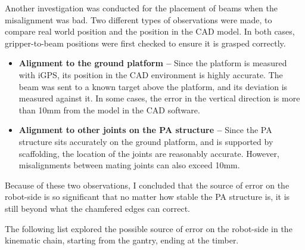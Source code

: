 Another investigation was conducted for the placement of beams when the misalignment was bad. Two different types of observations were made, to compare real world position and the position in the CAD model. In both cases, gripper-to-beam positions were first checked to ensure it is grasped correctly.

\begin{itemize}
	\item \textbf{Alignment to the ground platform --} Since the platform is measured with iGPS, its position in the CAD environment is highly accurate. The beam was sent to a known target above the platform, and its deviation is measured against it. In some cases, the error in the vertical direction is more than 10mm from the model in the CAD software. 

	\item \textbf{Alignment to other joints on the PA structure --} Since the PA structure sits accurately on the ground platform, and is supported by scaffolding, the location of the joints are reasonably accurate. However, misalignments between mating joints can also exceed 10mm. 

\end{itemize}

Because of these two observations, I concluded that the source of error on the robot-side is so significant that no matter how stable the PA structure is, it is still beyond what the chamfered edges can correct. 

The following list explored the possible source of error on the robot-side in the kinematic chain, starting from the gantry, ending at the timber.

